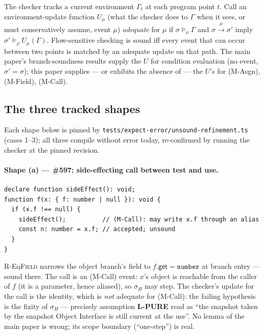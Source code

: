 \documentclass[11pt]{article}
\newcommand{\Env}{\Gamma}
\begin{document}
\begin{definition}
\label{def:discipline}
The checker tracks a current environment $\Env_t$ at each program point
$t$. Call an environment-update function $U_\mu$ (what the checker does
to $\Env$ when it sees, or must conservatively assume, event $\mu$)
\emph{adequate} for $\mu$ if
$\sigma \models_\rho \Env$ and $\sigma \xrightarrow{\mu} \sigma'$ imply
$\sigma' \models_{\rho}U_\mu(\Env)$. Flow-sensitive checking is sound iff
every event that can occur between two points is matched by an adequate
update on that path. The main paper's branch-soundness results supply the
$U$ for condition evaluation (no event, $\sigma' = \sigma$); this paper
supplies — or exhibits the absence of — the $U$'s for
(M-Asgn), (M-Field), (M-Call).
\end{definition}

\subsection{The three tracked shapes}
\label{sec:shapes}

Each shape below is pinned by
\texttt{tests/expect-error/unsound-refinement.ts} (cases 1--3); all three
compile without error today, re-confirmed by running the checker at the
pinned revision.

\paragraph{Shape (a) — \#597: side-effecting call between test and use.}
\begin{verbatim}
declare function sideEffect(): void;
function f(x: { f: number | null }): void {
  if (x.f !== null) {
    sideEffect();          // (M-Call): may write x.f through an alias
    const n: number = x.f; // accepted; unsound
  }
}
\end{verbatim}
\textsc{R-EqField} narrows the object branch's field to
$f.\mathsf{get} = \texttt{number}$ at branch entry — sound there. The
call is an (M-Call) event: $x$'s object is reachable from the caller of
$f$ (it is a parameter, hence aliased), so $\sigma_H$ may step. The
checker's update for the call is the identity, which is \emph{not}
adequate for (M-Call): the failing hypothesis is the fixity of $\sigma_H$
— precisely assumption \textbf{L-PURE} read as ``the snapshot taken by
the snapshot Object Interface is still current at the use''. No lemma of
the main paper is
wrong; its scope boundary (``one-step'') is real.
\end{document}
